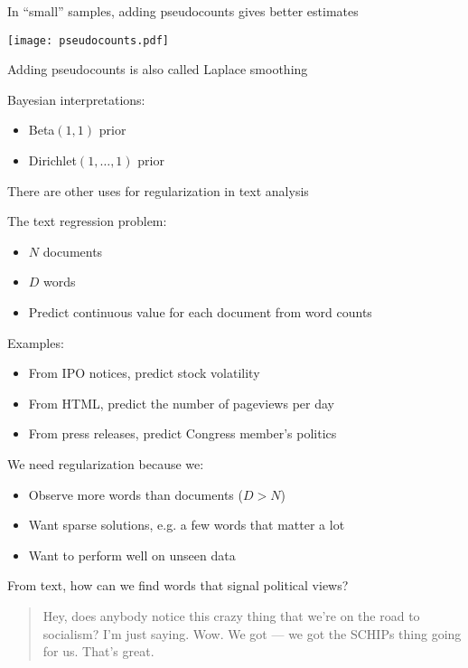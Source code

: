 \documentclass[xcolor=pdftex,dvipsnames,table]{beamer}
\begin{document}
\frame
{
	In ``small'' samples, adding pseudocounts gives better estimates
}

\frame
{
	\begin{center}
		\texttt{[image: pseudocounts.pdf]}
	\end{center}
}

\frame
{
	Adding pseudocounts is also called Laplace smoothing
}

\frame
{
	Bayesian interpretations:
	\begin{itemize}
		\item{Beta$(1, 1)$ prior}
		\item{Dirichlet$(1, \ldots, 1)$ prior}
	\end{itemize}
}

\frame
{
	There are other uses for regularization in text analysis
}

\frame
{
	The text regression problem:
	\begin{itemize}
		\item{$N$ documents}
		\item{$D$ words}
		\item{Predict continuous value for each document from word counts}
	\end{itemize}
}

\frame
{
	Examples:
	\begin{itemize}
		\item{From IPO notices, predict stock volatility}
		\item{From HTML, predict the number of pageviews per day}
		\item{From press releases, predict Congress member's politics}
	\end{itemize}
}

\frame
{
	We need regularization because we:
	\begin{itemize}
		\item{Observe more words than documents ($D > N$)}
		\item{Want sparse solutions, e.g. a few words that matter a lot}
		\item{Want to perform well on unseen data}
	\end{itemize}
}

\frame
{
	From text, how can we find words that signal political views?
}

\frame
{
	\begin{quote}
		Hey, does anybody notice this crazy thing that we're on the road to socialism? I'm just saying. Wow. We got --- we got the SCHIPs thing going for us. That's great.
	\end{quote}
}
\end{document}
